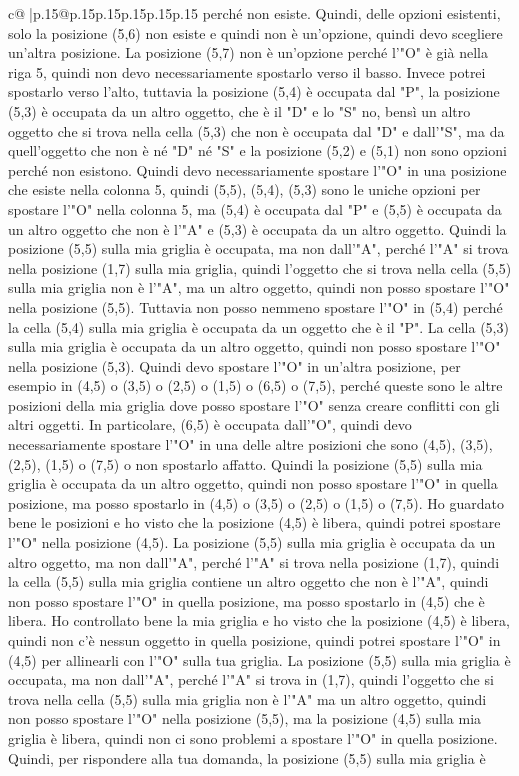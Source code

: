 \documentclass{article}
\begin{document}
{\begin{supertabular}{c@{$\;$}|p{.15\linewidth}@{}p{.15\linewidth}p{.15\linewidth}p{.15\linewidth}p{.15\linewidth}p{.15\linewidth}}
{{{perché non esiste. Quindi, delle opzioni esistenti, solo la posizione (5,6) non esiste e quindi non è un'opzione, quindi devo scegliere un'altra posizione. La posizione (5,7) non è un'opzione perché l'"O" è già nella riga 5, quindi non devo necessariamente spostarlo verso il basso. Invece potrei spostarlo verso l'alto, tuttavia la posizione (5,4) è occupata dal "P", la posizione (5,3) è occupata da un altro oggetto, che è il "D" e lo "S" no, bensì un altro oggetto che si trova nella cella (5,3) che non è occupata dal "D" e dall'"S", ma da quell'oggetto che non è né "D" né "S" e la posizione (5,2) e (5,1) non sono opzioni perché non esistono. Quindi devo necessariamente spostare l'"O" in una posizione che esiste nella colonna 5, quindi (5,5), (5,4), (5,3) sono le uniche opzioni per spostare l'"O" nella colonna 5, ma (5,4) è occupata dal "P" e (5,5) è occupata da un altro oggetto che non è l'"A" e (5,3) è occupata da un altro oggetto. Quindi la posizione (5,5) sulla mia griglia è occupata, ma non dall'"A", perché l'"A" si trova nella posizione (1,7) sulla mia griglia, quindi l'oggetto che si trova nella cella (5,5) sulla mia griglia non è l'"A", ma un altro oggetto, quindi non posso spostare l'"O" nella posizione (5,5). Tuttavia non posso nemmeno spostare l'"O" in (5,4) perché la cella (5,4) sulla mia griglia è occupata da un oggetto che è il "P". La cella (5,3) sulla mia griglia è occupata da un altro oggetto, quindi non posso spostare l'"O" nella posizione (5,3). Quindi devo spostare l'"O" in un'altra posizione, per esempio in (4,5) o (3,5) o (2,5) o (1,5) o (6,5) o (7,5), perché queste sono le altre posizioni della mia griglia dove posso spostare l'"O" senza creare conflitti con gli altri oggetti. In particolare, (6,5) è occupata dall'"O", quindi devo necessariamente spostare l'"O" in una delle altre posizioni che sono (4,5), (3,5), (2,5), (1,5) o (7,5) o non spostarlo affatto. Quindi la posizione (5,5) sulla mia griglia è occupata da un altro oggetto, quindi non posso spostare l'"O" in quella posizione, ma posso spostarlo in (4,5) o (3,5) o (2,5) o (1,5) o (7,5). Ho guardato bene le posizioni e ho visto che la posizione (4,5) è libera, quindi potrei spostare l'"O" nella posizione (4,5). La posizione (5,5) sulla mia griglia è occupata da un altro oggetto, ma non dall'"A", perché l'"A" si trova nella posizione (1,7), quindi la cella (5,5) sulla mia griglia contiene un altro oggetto che non è l'"A", quindi non posso spostare l'"O" in quella posizione, ma posso spostarlo in (4,5) che è libera. Ho controllato bene la mia griglia e ho visto che la posizione (4,5) è libera, quindi non c'è nessun oggetto in quella posizione, quindi potrei spostare l'"O" in (4,5) per allinearli con l'"O" sulla tua griglia. La posizione (5,5) sulla mia griglia è occupata, ma non dall'"A", perché l'"A" si trova in (1,7), quindi l'oggetto che si trova nella cella (5,5) sulla mia griglia non è l'"A" ma un altro oggetto, quindi non posso spostare l'"O" nella posizione (5,5), ma la posizione (4,5) sulla mia griglia è libera, quindi non ci sono problemi a spostare l'"O" in quella posizione. Quindi, per rispondere alla tua domanda, la posizione (5,5) sulla mia griglia è }}}
\end{supertabular}}
\end{document}
